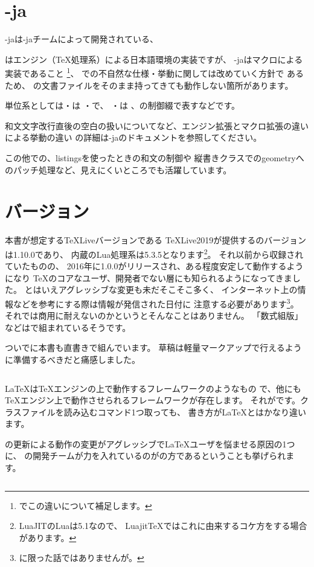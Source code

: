 \documentclass[main]{subfiles}
\begin{document}
\section{\LuaTeX{}-ja}
\LuaTeX{}-jaは\LuaTeX{}-jaチームによって開発されている、

\pTeX{}はエンジン（\TeX{}処理系）による日本語環境の実装ですが、
\LuaTeX{}-jaはマクロによる実装であること
\footnote{でこの違いについて補足します。}、
\pTeX{}での不自然な仕様・挙動に関しては改めていく方針で
あるため\cite{luatexja:doc}、
\pLaTeX{}の文書ファイルをそのまま持ってきても動作しない箇所があります。

単位系としては・は
\code{\zh}・\code{\zw}で、
・は
\code{\jH}、\code{\jQ}の制御綴で表すなどです。

和文文字改行直後の空白の扱いについてなど、エンジン拡張とマクロ拡張の違いによる挙動の違い
の詳細は\LuaTeX{}-jaのドキュメント\cite{luatexja:doc}を参照してください。

この他\LuaTeX{}での、listingsを使ったときの和文の制御や
縦書きクラスでのgeometryへのパッチ処理など、見えにくいところでも活躍しています。

\section{バージョン}
本書が想定する\TeX{}Liveバージョンである
\TeX{}Live2019が提供する\LuaTeX{}のバージョンは1.10.0であり、
内蔵のLua処理系は5.3.5となります\footnote{LuaJITのLuaは5.1なので、%
Luajit\TeX{}ではこれに由来するコケ方をする場合があります。}。
それ以前から収録されていたものの、
2016年に1.0.0がリリースされ、ある程度安定して動作するようになり
\TeX{}のコアなユーザ、開発者でない層にも知られるようになってきました。
とはいえアグレッシブな変更も未だそこそこ多く、
インターネット上の情報などを参考にする際は情報が発信された日付に
注意する必要があります\footnote{\LuaLaTeX{}に限った話ではありませんが。}。
それでは商用に耐えないのかというとそんなことはありません。
「数式組版」\cite{kieda:math}などは\LuaLaTeX{}で組まれているそうです\cite{kieda:tw}。

ついでに本書も\LuaLaTeX{}直書きで組んでいます。
草稿は軽量マークアップで行えるように準備するべきだと痛感しました。

\begin{column}[\ConTeXt{}]
\LaTeX{}は\TeX{}エンジンの上で動作するフレームワークのようなもの
で、他にも\TeX{}エンジン上で動作させられるフレームワークが存在します。
それが\ConTeXt{}です。クラスファイルを読み込むコマンド1つ取っても、
書き方が\LaTeX{}とはかなり違います。

\LuaTeX{}の更新による動作の変更がアグレッシブで\LaTeX{}ユーザを悩ませる原因の1つに、
\LuaTeX{}の開発チームが力を入れているのが\ConTeXt{}の方であるということも挙げられます。
\end{column}
\end{document}
